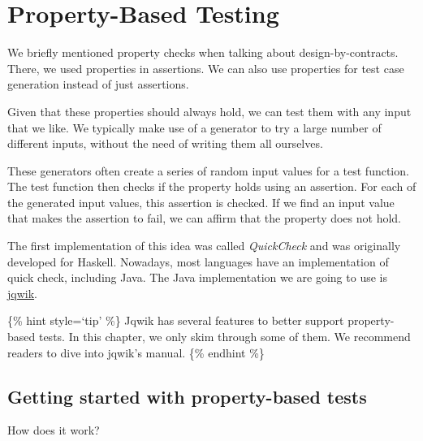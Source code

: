 \hypertarget{property-based-testing}{%
\section{Property-Based Testing}\label{property-based-testing}}

We briefly mentioned property checks when talking about
design-by-contracts. There, we used properties in assertions. We can
also use properties for test case generation instead of just assertions.

Given that these properties should always hold, we can test them with
any input that we like. We typically make use of a generator to try a
large number of different inputs, without the need of writing them all
ourselves.

These generators often create a series of random input values for a test
function. The test function then checks if the property holds using an
assertion. For each of the generated input values, this assertion is
checked. If we find an input value that makes the assertion to fail, we
can affirm that the property does not hold.

The first implementation of this idea was called \emph{QuickCheck} and
was originally developed for Haskell. Nowadays, most languages have an
implementation of quick check, including Java. The Java implementation
we are going to use is \href{https://jqwik.net}{jqwik}.

\{\% hint style=`tip' \%\} Jqwik has several features to better support
property-based tests. In this chapter, we only skim through some of
them. We recommend readers to dive into jqwik's manual. \{\% endhint
\%\}

\hypertarget{getting-started-with-property-based-tests}{%
\subsection{Getting started with property-based
tests}\label{getting-started-with-property-based-tests}}

How does it work?

